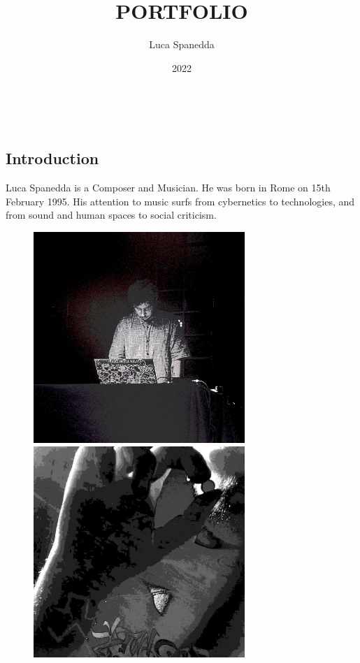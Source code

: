 \documentclass[12pt,landscape]{article}
\begin{document}
\LARGE
\color{white}
{\tt
\title{PORTFOLIO}
\author{Luca Spanedda}
\date{2022}
\maketitle
\clearpage
\begin{center}



\section{Introduction}

Luca Spanedda is a Composer and Musician.
He was born in Rome on 15th February 1995.
\newline
His attention to music surfs from cybernetics to technologies,
and from sound and human spaces to social criticism.

\begin{figure}[!htb]
  \includegraphics[width=8cm]{portfolio1.jpg}

\endminipage\hfill
{}
  \includegraphics[width=8cm]{portfolio2.jpg}


\end{figure}
\end{center}}
\end{document}
